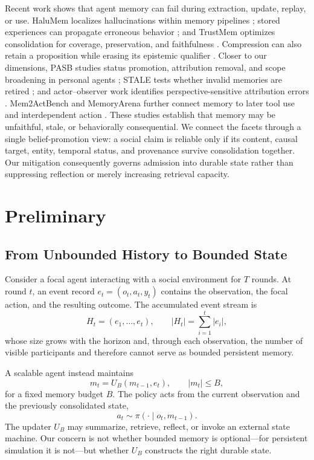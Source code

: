 \documentclass[sigconf,anonymous]{acmart}
\begin{document}
Recent work shows that agent memory can fail during extraction, update, replay,
or use. HaluMem localizes hallucinations within memory pipelines
\cite{chen2026halumem}; stored experiences can propagate erroneous behavior
\cite{xiong2026memory}; and TrustMem optimizes consolidation for coverage,
preservation, and faithfulness \cite{yang2026trustmem}. Compression can also
retain a proposition while erasing its epistemic qualifier
\cite{kwon2026explicit}. Closer to our dimensions, PASB studies status
promotion, attribution removal, and scope broadening in personal agents
\cite{mao2026pasb}; STALE tests whether invalid memories are retired
\cite{chao2026stale}; and actor--observer work identifies
perspective-sensitive attribution errors \cite{li2026actorobserver}.
Mem2ActBench and MemoryArena further connect memory to later tool use and
interdependent action \cite{shen2026mem2act,he2026memoryarena}. These studies
establish that memory may be unfaithful, stale, or behaviorally consequential.
We connect the facets through a single belief-promotion view: a social claim is
reliable only if its content, causal target, entity, temporal status, and
provenance survive consolidation together. Our mitigation consequently governs
admission into durable state rather than suppressing reflection or merely
increasing retrieval capacity.

\section{Preliminary}
\label{sec:prelim}

\subsection{From Unbounded History to Bounded State}

Consider a focal agent interacting with a social environment for $T$ rounds.
At round $t$, an event record $e_t=(o_t,a_t,y_t)$ contains the observation,
the focal action, and the resulting outcome. The accumulated event stream is
\begin{equation}
  H_t=(e_1,\ldots,e_t), \qquad |H_t|=\sum_{i=1}^{t}|e_i|,
  \label{eq:accumulated-history}
\end{equation}
whose size grows with the horizon and, through each observation, the number of
visible participants and therefore cannot serve as bounded persistent memory.

A scalable agent instead maintains
\begin{equation}
  m_t=U_B(m_{t-1},e_t), \qquad |m_t|\le B,
  \label{eq:bounded-memory}
\end{equation}
for a fixed memory budget $B$. The policy acts from the current observation and
the previously consolidated state,
\begin{equation}
  a_t\sim\pi(\cdot\mid o_t,m_{t-1}).
  \label{eq:policy}
\end{equation}
The updater $U_B$ may summarize, retrieve, reflect, or invoke an external state
machine. Our concern is not whether bounded memory is optional---for persistent
simulation it is not---but whether $U_B$ constructs the right durable state.
\end{document}
